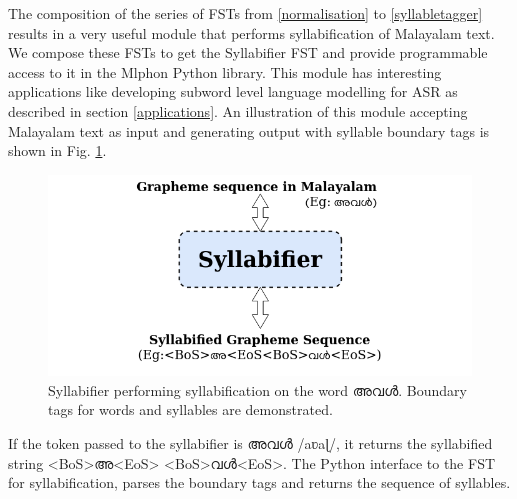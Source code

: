 The composition of the series of FSTs from \ref{normalisation} to
\ref{syllabletagger} results in a very useful module that performs
syllabification of Malayalam text. We compose these FSTs to get the Syllabifier
FST and provide programmable access to it in the Mlphon Python library. This
module has interesting applications like developing subword level language
modelling for ASR as described in section \ref{applications}. An illustration of
this module accepting Malayalam text as input and generating output with
syllable boundary tags is shown in Fig. \ref{fig:syllabifierblock}.

\begin{figure}[htpb]
	\begin{center}
		\includegraphics[width=0.7\linewidth]{syllabifier.png}
		\caption{Syllabifier performing syllabification on the word {\mal അവൾ}. Boundary tags for words and syllables are demonstrated.}
		\label{fig:syllabifierblock}
	\end{center}

\end{figure}


If the token passed to the syllabifier is {\mal അവൾ} {\ipa /aʋaɭ/}, it returns the
syllabified string {\ipa <BoS>}{\mal അ}{\ipa <EoS> <BoS>}{\mal വൾ}{\ipa <EoS>}.
The Python interface to the FST for syllabification, parses the boundary tags
and returns the sequence of syllables.

